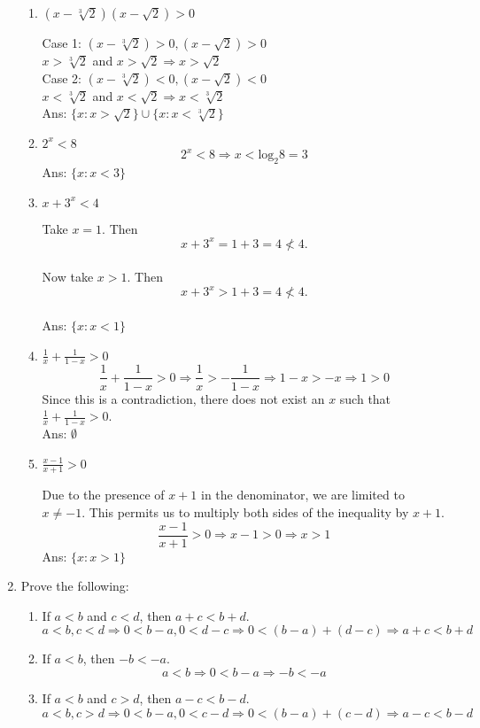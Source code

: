 \documentclass[12pt]{article}
\begin{document}
\begin{enumerate}
\begin{enumerate}
\item $(x - \sqrt[3]{2})(x - \sqrt{2}) > 0$

Case 1: $(x - \sqrt[3]{2}) > 0, (x - \sqrt{2}) > 0$\\
$x > \sqrt[3]{2}$ and $x > \sqrt{2} \Rightarrow x > \sqrt{2}$\\
Case 2: $(x - \sqrt[3]{2}) < 0, (x - \sqrt{2}) < 0$\\
$x < \sqrt[3]{2}$ and $x < \sqrt{2} \Rightarrow x <  \sqrt[3]{2}$\\
Ans: $\{x :  x > \sqrt{2}\} \cup \{x : x < \sqrt[3]{2}\}$

\item $2^x < 8$
$$2^x < 8 \Rightarrow x < \text{log}_2{8} = 3$$
Ans: $\{x : x < 3\}$

\item $x + 3^x < 4$

Take $x = 1$. Then $$x + 3^x = 1 + 3 = 4 \nless 4.$$\\
Now take $x > 1$. Then $$x + 3^x > 1 + 3 = 4 \nless 4.$$\\
Ans: $\{x : x < 1\}$

\item $\frac{1}{x} + \frac{1}{1 - x} > 0$
$$\frac{1}{x} + \frac{1}{1 - x} > 0 \Rightarrow \frac{1}{x} > -\frac{1}{1 - x} \Rightarrow 1 - x > -x \Rightarrow 1 > 0$$
Since this is a contradiction, there does not exist an $x$ such that $\frac{1}{x} + \frac{1}{1 - x} > 0$.\\
Ans: $\emptyset$

\item $\frac{x - 1}{x + 1} > 0$

Due to the presence of $x + 1$ in the denominator, we are limited to $x \neq -1$. This permits us to multiply both sides of the inequality by $x + 1$.\\
$$\frac{x - 1}{x + 1} > 0 \Rightarrow x - 1 > 0 \Rightarrow x > 1$$
Ans: $\{x : x > 1\}$
\end{enumerate}
\item Prove the following:
\begin{enumerate}
\item If $a < b$ and $c < d$, then $a + c < b + d$.
$$ a < b, c < d \Rightarrow 0 < b - a, 0 < d - c \Rightarrow 0 < (b - a) + (d - c) \Rightarrow a + c < b + d $$

\item If $a < b$, then $-b< -a$.
$$ a < b \Rightarrow 0 < b - a \Rightarrow -b < -a$$

\item If $a < b$ and $c > d$, then $a - c < b - d$.
$$ a < b, c > d \Rightarrow 0 < b - a, 0 < c - d \Rightarrow 0 < (b - a) + (c - d) \Rightarrow a - c < b - d$$


\end{enumerate}
\end{enumerate}
\end{document}
